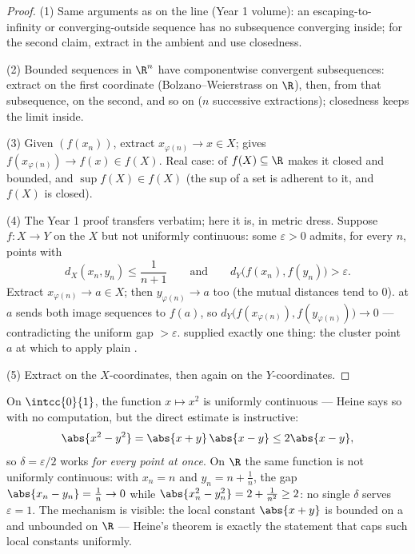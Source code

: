\begin{proof}
(1) Same arguments as on the line (Year 1 volume): an escaping-to-%
infinity or converging-outside sequence has no subsequence
converging inside; for the second claim, extract in the ambient
 and use closedness.

(2) Bounded sequences in $\R^n$ have componentwise convergent
subsequences: extract on the first coordinate
(Bolzano--Weierstrass on $\R$), then, from that subsequence, on the
second, and so on ($n$ successive extractions); closedness keeps
the limit inside.

(3) Given $(f(x_n))$, extract $x_{\varphi(n)} \to x \in X$;
 gives $f(x_{\varphi(n)}) \to f(x) \in f(X)$. Real case:
 of $f(X) \subseteq \R$ makes it closed and bounded, and
$\sup f(X) \in f(X)$ (the sup of a set is adherent to it, and
$f(X)$ is closed).

(4) The Year 1 proof transfers verbatim; here it is, in metric
dress. Suppose $f \colon X \to Y$  on the  $X$
but not uniformly continuous: some $\varepsilon > 0$ admits, for
every $n$, points with
\[
d_X(x_n, y_n) \leq \frac{1}{n+1}
\qquad\text{and}\qquad
d_Y\bigl(f(x_n), f(y_n)\bigr) > \varepsilon .
\]
Extract $x_{\varphi(n)} \to a \in X$; then $y_{\varphi(n)} \to
a$ too (the mutual distances tend to $0$).  at $a$
sends both image sequences to $f(a)$, so
$d_Y\bigl(f(x_{\varphi(n)}), f(y_{\varphi(n)})\bigr) \to 0$ ---
contradicting the uniform gap $> \varepsilon$. 
supplied exactly one thing: the cluster point $a$ at which to
apply plain .

(5) Extract on the $X$-coordinates, then again on the
$Y$-coordinates.
\end{proof}

\begin{example}\label{ex:b2:metric:heinework}
On $\intcc{0}{1}$, the function $x \mapsto x^2$ is uniformly
continuous --- Heine says so with no computation, but the direct
estimate is instructive:
\[
\abs{x^2 - y^2} = \abs{x + y}\,\abs{x - y} \leq 2\abs{x - y},
\]
so $\delta = \varepsilon/2$ works \emph{for every point at
once}. On $\R$ the same function is not uniformly continuous:
with $x_n = n$ and $y_n = n + \frac1n$, the gap $\abs{x_n - y_n}
= \frac1n \to 0$ while $\abs{x_n^2 - y_n^2} = 2 + \frac1{n^2}
\geq 2$: no single $\delta$ serves $\varepsilon = 1$. The
mechanism is visible: the local  constant $\abs{x + y}$
is bounded on a  and unbounded on $\R$ --- Heine's
theorem is exactly the statement that  caps such
local constants uniformly.
\end{example}

